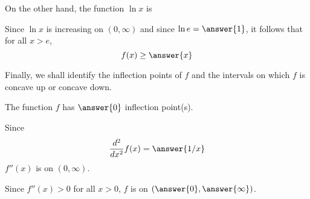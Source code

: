 \documentclass{ximera}
\begin{document}
\begin{exercise}
\begin{exercise}
\begin{exercise}
\begin{exercise}
\begin{exercise}
\begin{exercise}
\begin{exercise}
\begin{exercise}
\begin{exercise}
On the other hand, the function $\ln x$ is 
\begin{multipleChoice}
\end{multipleChoice}
\begin{exercise}
Since $\ln x$ is increasing on $(0,\infty)$ and since $\ln e=\answer{1}$, it follows that for all $x>e$, 
\[
f(x)\ge \answer{x}
\]

\begin{exercise}
Finally, we shall identify the inflection points of $f$ and the intervals on which $f$ is concave up or concave down.

The function $f$ has $\answer{0}$ inflection point(s).
\begin{exercise}
Since
\[
\frac{d^2}{dx^2}f(x)=\answer{1/x}
\]
$f''(x)$ is  on $(0,\infty)$. 
\begin{exercise}
Since $f''(x)>0$ for all $x>0$, $f$ is  on $(\answer{0},\answer{\infty})$.
\end{exercise}
\end{exercise}
\end{exercise}
\end{exercise}
\end{exercise}
\end{exercise}
\end{exercise}
\end{exercise}
\end{exercise}
\end{exercise}
\end{exercise}
\end{exercise}
\end{exercise}
\end{document}

